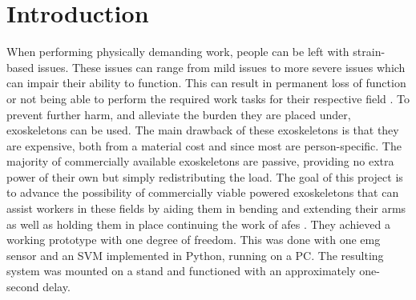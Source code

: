 \section{Introduction}
\label{section:intro}

When performing physically demanding work, people can be left with strain-based issues. These issues can range from mild issues to more severe issues which can impair their ability to function. 
This can result in permanent loss of function or not being able to perform the required work tasks for their respective field \cite{WorkDemands}. To prevent further harm, and alleviate the burden they are placed under, exoskeletons can be used.
The main drawback of these exoskeletons is that they are expensive, both from a material cost and since most are person-specific. The majority of commercially available 
exoskeletons are passive, providing no extra power of their own but simply redistributing the load. The goal of this 
project is to advance the possibility of commercially viable powered exoskeletons that can assist workers in these fields by aiding 
them in bending and extending their arms as well as holding them in place continuing the work of \acrfull{afes} \cite{AFES}. They achieved a working prototype with one degree of freedom. 
This was done with one \acrshort{emg} sensor and an SVM implemented in Python, running on a PC. The resulting system was mounted on a stand and functioned with an approximately one-second delay. 

